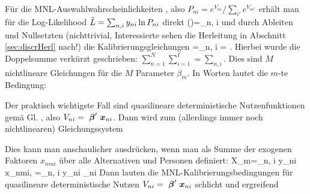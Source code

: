 F\"ur die MNL-Auswahlwahrscheinlichkeiten , also
$P_{ni}=e^{V_{ni}}/\sum_{i'}e^{V_{ni'}}$  erh\"alt man f\"ur die
Log-Likelihood $\tilde{L}=\sum_{n,i}y_{ni} \ln P_{ni}$ direkt
\be
\label{lMNLAllg}
\tilL(\vec{\beta})=\sum\limits_{n, i} 
\ee
und durch Ableiten und Nullsetzten (nichttrivial, Interessierte sehen die Herleitung
in Abschnitt \ref{sec:discrHerl} nach!) die Kalibrierungsgleichungen
\be
\label{kalibMNLAllg}
\ablpart{\tilL(\vec{\beta})}{\vecbeta}
=\sum\limits_{n, i} 
 = .
\ee
Hierbei wurde die Doppelsumme verk\"urzt geschrieben:
$\sum_{n=1}^N\sum_{i=1}^I=\sum_{n,i}$. 
Dies sind $M$ nichtlineare Gleichungen f\"ur die $M$ Parameter $\beta_m$.
In Worten lautet die $m$-te Bedingung:

\vspace{1em}

\noindent 
Der praktisch wichtigste Fall sind quasilineare deterministische
Nutzenfunktionen gem\"a\3 Gl. , also 
$V_{ni}={\mbox{ \boldmath{$\beta$}}}'{\mbox{ \boldmath{$x$}}}_{ni}$. Dann wird
 zum (allerdings immer noch nichtlinearen)
Gleichungssystem  

Dies kann man anschaulicher ausdr\"ucken, wenn man
 als Summe der exogenen Faktoren $x_{nmi}$
\"uber alle Alternativen und Personen definiert:
\be
\label{Merkmalssumme}
X_m=\sum_{n, i} y_{ni} x_{nmi}, \quad {} \quad 
{}=\sum_{n, i} y_{ni} _{ni}
\ee
Dann lauten die MNL-Kalibrierungsbedingungen f\"ur quasilineare
deterministische Nutzen $V_{ni}={\mbox{ \boldmath{$\beta$}}}'{\mbox{ \boldmath{$x$}}}_{ni}$ schlicht und
ergreifend


